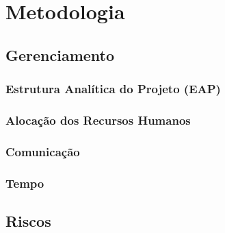\chapter{Metodologia}
  \section{Gerenciamento}
    \subsection{Estrutura Analítica do Projeto (EAP)}
    \subsection{Alocação dos Recursos Humanos}
    \subsection{Comunicação}
    \subsection{Tempo}

  \section{Riscos}
  
